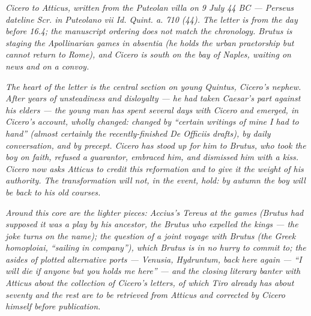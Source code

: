 
\textit{Cicero to Atticus, written from the Puteolan villa on
9 July 44 BC --- Perseus dateline \textit{Scr. in Puteolano
vii Id. Quint. a. 710 (44)}. The letter is from the day before
16.4; the manuscript ordering does not match the chronology.
Brutus is staging the Apollinarian games \textit{in absentia}
(he holds the urban praetorship but cannot return to Rome),
and Cicero is south on the bay of Naples, waiting on news and
on a convoy.}

\textit{The heart of the letter is the central section on
young Quintus, Cicero's nephew. After years of unsteadiness
and disloyalty --- he had taken Caesar's part against his
elders --- the young man has spent several days with Cicero
and emerged, in Cicero's account, wholly changed: changed by
``certain writings of mine I had to hand'' (almost certainly
the recently-finished \textit{De Officiis} drafts), by daily
conversation, and by precept. Cicero has stood up for him to
Brutus, who took the boy on faith, refused a guarantor,
embraced him, and dismissed him with a kiss. Cicero now asks
Atticus to credit this reformation and to give it the weight
of his authority. The transformation will not, in the event,
hold: by autumn the boy will be back to his old courses.}

\textit{Around this core are the lighter pieces: Accius's
\textit{Tereus} at the games (Brutus had supposed it was a
play by his ancestor, the Brutus who expelled the kings ---
the joke turns on the name); the question of a joint voyage
with Brutus (the Greek \textit{homoploiai}, ``sailing in
company''), which Brutus is in no hurry to commit to; the
asides of plotted alternative ports --- Venusia, Hydruntum,
back here again --- ``I will die if anyone but you holds me
here'' --- and the closing literary banter with Atticus about
the collection of Cicero's letters, of which Tiro already has
about seventy and the rest are to be retrieved from Atticus
and corrected by Cicero himself before publication.}
